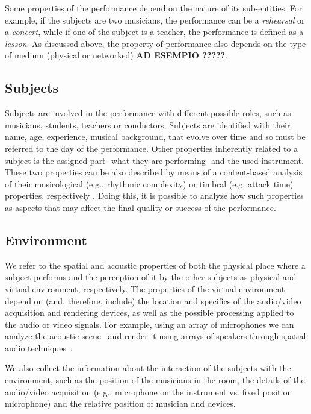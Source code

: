 Some properties of the performance depend on the nature of its sub-entities. For example, if the subjects are two musicians, the performance can be a \textit{rehearsal} or a \textit{concert}, while if one of the subject is a teacher, the performance is defined as a \textit{lesson}. As discussed above, the property of performance also depends on the type of medium (physical or networked) \textbf{AD ESEMPIO ?????}.   

\subsection{Subjects}
Subjects are involved in the performance with different possible roles, such as musicians, students, teachers or conductors. Subjects are identified with their name, age, experience, musical background, that evolve over time and so must be referred to the day of the performance. Other properties inherently related to a subject is the assigned part -what they are performing- and the used instrument. These two properties can be also described by means of a content-based analysis of their musicological (e.g., rhythmic complexity) or timbral (e.g. attack time) properties, respectively \cite{RottondiFeature}.
Doing this, it is possible to analyze how such properties as aspects that may affect the final quality or success of the performance.


\subsection{Environment}
We refer to the spatial and acoustic properties of both the physical place where a subject performs and the perception of it by the other subjects as physical and virtual environment, respectively. The properties of the virtual environment depend on (and, therefore, include) the location and specifics of the audio/video acquisition and rendering devices, as well as the possible processing applied to the audio or video signals. For example, using an array of microphones we can %
analyze the acoustic scene~\cite{Markovic2013} and render it using arrays of speakers through spatial audio techniques~\cite{bianchi2016}.

We also collect the information about the interaction of the subjects with the environment, such as the position of the musicians in the room, the details of the audio/video acquisition (e.g., microphone on the instrument vs. fixed position microphone) and the relative position of musician and devices. 


